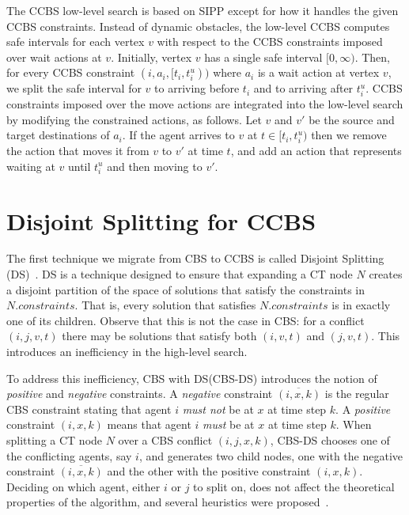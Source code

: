 \documentclass[letterpaper]{article} %
\newcommand{\cbs}{\ac{CBS}\xspace}
\newcommand{\ccbs}{\ac{CCBS}\xspace}
\newcommand{\cbsds}{{CBS-DS}\xspace}
\newcommand{\ct}{\ac{CT}\xspace}
\newcommand{\sipp}{\ac{SIPP}\xspace}
\newcommand{\const}{\textit{constraints}\xspace}
\newcommand{\ds}{\ac{DS}\xspace}
\begin{document}
The \ccbs low-level search is based on \sipp except for how it handles the given \ccbs constraints. 
Instead of dynamic obstacles, the low-level \ccbs computes safe intervals for each vertex $v$ with respect to the \ccbs constraints imposed over wait actions at $v$. 
Initially, vertex $v$ has a single safe interval $[0, \infty)$. 
Then, for every \ccbs constraint $(i, a_i, [t_i, t_i^u))$ 
where $a_i$ is a wait action at vertex $v$, we split the safe interval for $v$ 
to arriving before $t_i$ and to arriving after $t_i^u$. 
\ccbs constraints imposed over the move actions are integrated into the low-level search by modifying the constrained actions, as follows. 
Let $v$ and $v'$ be the source and target destinations of $a_i$. 
If the agent arrives to $v$ at $t\in [t_i, t^u_i)$ then we remove the action that moves it from $v$ to $v'$ at time $t$, and add an action that represents waiting at $v$ until $t^u_i$ and then moving to $v'$.


\section{Disjoint Splitting for \ccbs}

The first technique we migrate from \cbs to \ccbs is called Disjoint Splitting (\ds)~\cite{li2019disjoint}. 
\ds is a technique designed to ensure that expanding a \ct node $N$ creates a disjoint partition of the space of solutions that satisfy the constraints in $N.\const$.  
That is, every solution that satisfies $N.\const$ is in exactly one of its children. Observe that this is not the case in \cbs: for a conflict $(i,j,v,t)$ there may be solutions that satisfy both $(i,v,t)$ and $(j,v,t)$. 
This introduces an inefficiency in the high-level search. 


To address this inefficiency, \cbs with \ds (\cbsds) introduces the notion of \emph{positive} and \emph{negative} constraints.   
A \emph{negative} constraint $\overline{(i, x, k)}$ is the regular \cbs constraint stating that agent $i$ \emph{must not} be at $x$ at time step $k$.
A \emph{positive} constraint $(i, x, k)$ means that agent $i$ \emph{must} be at $x$ at time step $k$. When splitting a \ct node $N$ over a \cbs conflict $(i, j, x, k)$, 
\cbsds chooses one of the conflicting agents, say $i$, 
and generates two child nodes, one with the negative constraint $\overline{(i, x, k)}$ 
and the other with the positive constraint $(i,x,k)$. 
Deciding on which agent, either $i$ or $j$ to split on, does not affect the theoretical properties of the algorithm, and several heuristics were proposed~\cite{li2019disjoint}. 
\end{document}
